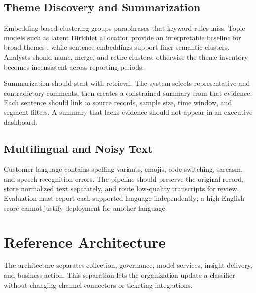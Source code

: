 \documentclass[11pt,a4paper,twoside]{article}
\begin{document}
\subsection{Theme Discovery and Summarization}

Embedding-based clustering groups paraphrases that keyword rules miss. Topic models such as latent Dirichlet allocation provide an interpretable baseline for broad themes \cite{blei2003}, while sentence embeddings support finer semantic clusters. Analysts should name, merge, and retire clusters; otherwise the theme inventory becomes inconsistent across reporting periods.

Summarization should start with retrieval. The system selects representative and contradictory comments, then creates a constrained summary from that evidence. Each sentence should link to source records, sample size, time window, and segment filters. A summary that lacks evidence should not appear in an executive dashboard.

\subsection{Multilingual and Noisy Text}

Customer language contains spelling variants, emojis, code-switching, sarcasm, and speech-recognition errors. The pipeline should preserve the original record, store normalized text separately, and route low-quality transcripts for review. Evaluation must report each supported language independently; a high English score cannot justify deployment for another language.

\newpage

\section{Reference Architecture}

The architecture separates collection, governance, model services, insight delivery, and business action. This separation lets the organization update a classifier without changing channel connectors or ticketing integrations.
\end{document}
